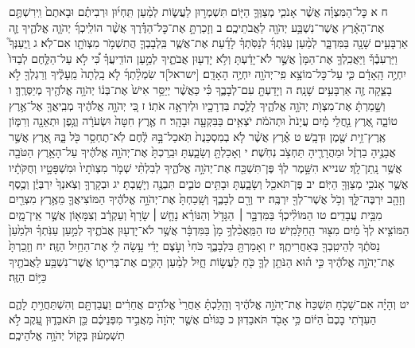 \documentclass[twoside, openany, parskip=half, 11pt]{book}
\begin{document}
ח א כׇּל־הַמִּצְוָ֗ה אֲשֶׁ֨ר אָנֹכִ֧י מְצַוְּךָ֛ הַיּ֖וֹם תִּשְׁמְר֣וּן לַעֲשׂ֑וֹת לְמַ֨עַן תִּֽחְי֜וּן וּרְבִיתֶ֗ם וּבָאתֶם֙ וִֽירִשְׁתֶּ֣ם אֶת־הָאָ֔רֶץ אֲשֶׁר־נִשְׁבַּ֥ע יְהֹוָ֖ה לַאֲבֹתֵיכֶֽם׃ ב וְזָכַרְתָּ֣ אֶת־כׇּל־הַדֶּ֗רֶךְ אֲשֶׁ֨ר הוֹלִֽיכְךָ֜ יְהֹוָ֧ה אֱלֹהֶ֛יךָ זֶ֛ה אַרְבָּעִ֥ים שָׁנָ֖ה בַּמִּדְבָּ֑ר לְמַ֨עַן עַנֹּֽתְךָ֜ לְנַסֹּֽתְךָ֗ לָדַ֜עַת אֶת־אֲשֶׁ֧ר בִּֽלְבָבְךָ֛ הֲתִשְׁמֹ֥ר מִצְוֺתָ֖ו אִם־לֹֽא׃ ג וַֽיְעַנְּךָ֮ וַיַּרְעִבֶ֒ךָ֒ וַיַּאֲכִֽלְךָ֤ אֶת־הַמָּן֙ אֲשֶׁ֣ר לֹא־יָדַ֔עְתָּ וְלֹ֥א יָדְע֖וּן אֲבֹתֶ֑יךָ לְמַ֣עַן הוֹדִֽיעֲךָ֗ כִּ֠י לֹ֣א עַל־הַלֶּ֤חֶם לְבַדּוֹ֙ יִחְיֶ֣ה הָֽאָדָ֔ם כִּ֛י עַל־כׇּל־מוֹצָ֥א פִֽי־יְהֹוָ֖ה יִחְיֶ֥ה הָאָדָֽם׃ [ישראל]ד שִׂמְלָ֨תְךָ֜ לֹ֤א בָֽלְתָה֙ מֵֽעָלֶ֔יךָ וְרַגְלְךָ֖ לֹ֣א בָצֵ֑קָה זֶ֖ה אַרְבָּעִ֥ים שָׁנָֽה׃ ה וְיָדַעְתָּ֖ עִם־לְבָבֶ֑ךָ כִּ֗י כַּאֲשֶׁ֨ר יְיַסֵּ֥ר אִישׁ֙ אֶת־בְּנ֔וֹ יְהֹוָ֥ה אֱלֹהֶ֖יךָ מְיַסְּרֶֽךָּ׃ ו וְשָׁ֣מַרְתָּ֔ אֶת־מִצְוֺ֖ת יְהֹוָ֣ה אֱלֹהֶ֑יךָ לָלֶ֥כֶת בִּדְרָכָ֖יו וּלְיִרְאָ֥ה אֹתֽוֹ׃ ז כִּ֚י יְהֹוָ֣ה אֱלֹהֶ֔יךָ מְבִֽיאֲךָ֖ אֶל־אֶ֣רֶץ טוֹבָ֑ה אֶ֚רֶץ נַ֣חֲלֵי מָ֔יִם עֲיָנֹת֙ וּתְהֹמֹ֔ת יֹצְאִ֥ים בַּבִּקְעָ֖ה וּבָהָֽר׃ ח אֶ֤רֶץ חִטָּה֙ וּשְׂעֹרָ֔ה וְגֶ֥פֶן וּתְאֵנָ֖ה וְרִמּ֑וֹן אֶֽרֶץ־זֵ֥ית שֶׁ֖מֶן וּדְבָֽשׁ׃ ט אֶ֗רֶץ אֲשֶׁ֨ר לֹ֤א בְמִסְכֵּנֻת֙ תֹּֽאכַל־בָּ֣הּ לֶ֔חֶם לֹֽא־תֶחְסַ֥ר כֹּ֖ל בָּ֑הּ אֶ֚רֶץ אֲשֶׁ֣ר אֲבָנֶ֣יהָ בַרְזֶ֔ל וּמֵהֲרָרֶ֖יהָ תַּחְצֹ֥ב נְחֹֽשֶׁת׃ י וְאָכַלְתָּ֖ וְשָׂבָ֑עְתָּ וּבֵֽרַכְתָּ֙ אֶת־יְהֹוָ֣ה אֱלֹהֶ֔יךָ עַל־הָאָ֥רֶץ הַטֹּבָ֖ה אֲשֶׁ֥ר נָֽתַן־לָֽךְ׃ שנייא הִשָּׁ֣מֶר לְךָ֔ פֶּן־תִּשְׁכַּ֖ח אֶת־יְהֹוָ֣ה אֱלֹהֶ֑יךָ לְבִלְתִּ֨י שְׁמֹ֤ר מִצְוֺתָיו֙ וּמִשְׁפָּטָ֣יו וְחֻקֹּתָ֔יו אֲשֶׁ֛ר אָנֹכִ֥י מְצַוְּךָ֖ הַיּֽוֹם׃ יב פֶּן־תֹּאכַ֖ל וְשָׂבָ֑עְתָּ וּבָתִּ֥ים טֹבִ֛ים תִּבְנֶ֖ה וְיָשָֽׁבְתָּ׃ יג וּבְקָֽרְךָ֤ וְצֹֽאנְךָ֙ יִרְבְּיֻ֔ן וְכֶ֥סֶף וְזָהָ֖ב יִרְבֶּה־לָּ֑ךְ וְכֹ֥ל אֲשֶׁר־לְךָ֖ יִרְבֶּֽה׃ יד וְרָ֖ם לְבָבֶ֑ךָ וְשָֽׁכַחְתָּ֙ אֶת־יְהֹוָ֣ה אֱלֹהֶ֔יךָ הַמּוֹצִיאֲךָ֛ מֵאֶ֥רֶץ מִצְרַ֖יִם מִבֵּ֥ית עֲבָדִֽים׃ טו הַמּוֹלִ֨יכְךָ֜ בַּמִּדְבָּ֣ר ׀ הַגָּדֹ֣ל וְהַנּוֹרָ֗א נָחָ֤שׁ ׀ שָׂרָף֙ וְעַקְרָ֔ב וְצִמָּא֖וֹן אֲשֶׁ֣ר אֵֽין־מָ֑יִם הַמּוֹצִ֤יא לְךָ֙ מַ֔יִם מִצּ֖וּר הַֽחַלָּמִֽישׁ׃ טז הַמַּֽאֲכִ֨לְךָ֥ מָן֙ בַּמִּדְבָּ֔ר אֲשֶׁ֥ר לֹא־יָדְע֖וּן אֲבֹתֶ֑יךָ לְמַ֣עַן עַנֹּֽתְךָ֗ וּלְמַ֙עַן֙ נַסֹּתֶ֔ךָ לְהֵיטִֽבְךָ֖ בְּאַחֲרִיתֶֽךָ׃ יז וְאָמַרְתָּ֖ בִּלְבָבֶ֑ךָ כֹּחִי֙ וְעֹ֣צֶם יָדִ֔י עָ֥שָׂה לִ֖י אֶת־הַחַ֥יִל הַזֶּֽה׃ יח וְזָֽכַרְתָּ֙ אֶת־יְהֹוָ֣ה אֱלֹהֶ֔יךָ כִּ֣י ה֗וּא הַנֹּתֵ֥ן לְךָ֛ כֹּ֖חַ לַעֲשׂ֣וֹת חָ֑יִל לְמַ֨עַן הָקִ֧ים אֶת־בְּרִית֛וֹ אֲשֶׁר־נִשְׁבַּ֥ע לַאֲבֹתֶ֖יךָ כַּיּ֥וֹם הַזֶּֽה׃

יט וְהָיָ֗ה אִם־שָׁכֹ֤חַ תִּשְׁכַּח֙ אֶת־יְהֹוָ֣ה אֱלֹהֶ֔יךָ וְהָֽלַכְתָּ֗ אַחֲרֵי֙ אֱלֹהִ֣ים אֲחֵרִ֔ים וַעֲבַדְתָּ֖ם וְהִשְׁתַּחֲוִ֣יתָ לָהֶ֑ם הַעִדֹ֤תִי בָכֶם֙ הַיּ֔וֹם כִּ֥י אָבֹ֖ד תֹּאבֵדֽוּן׃ כ כַּגּוֹיִ֗ם אֲשֶׁ֤ר יְהֹוָה֙ מַאֲבִ֣יד מִפְּנֵיכֶ֔ם כֵּ֖ן תֹּאבֵד֑וּן עֵ֚קֶב לֹ֣א תִשְׁמְע֔וּן בְּק֖וֹל יְהֹוָ֥ה אֱלֹהֵיכֶֽם׃
\end{document}
